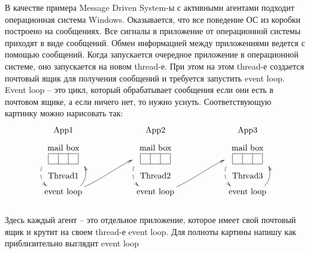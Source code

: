 В качестве примера Message Driven System-ы с активными агентами подходит операционная система Windows.
Оказывается, что все поведение ОС из коробки построено на сообщениях.
Все сигналы в приложение от операционной системы приходят в виде сообщений.
Обмен информацией между приложениями ведется с помощью сообщений.
Когда запускается очередное приложение в операционной системе, оно запускается на новом thread-е.
При этом на этом thread-е создается почтовый ящик для получения сообщений и требуется запустить event loop.
Event loop -- это цикл, который обрабатывает сообщения если они есть в почтовом ящике, а если ничего нет, то нужно уснуть.
Соответствующую картинку можно нарисовать так:
\[
\xymatrix@R=5pt{
  {\text{App1}}&{}&{\text{App2}}&{}&{\text{App3}}\\
  {
  \begin{tabular}{c}
  mail box\\
  \begin{tabular}{|c|c|c|}
  \hline
  {}&{}&{}\\
  \hline
  \end{tabular}
  \end{tabular}
  }
  \ar@(l,l)@{-->}[dd]
  &{}&{
  \begin{tabular}{c}
  mail box\\
  \begin{tabular}{|c|c|c|}
  \hline
  {}&{}&{}\\
  \hline
  \end{tabular}
  \end{tabular}
  }
  \ar@(l,l)@{-->}[dd]
  &{}&{
  \begin{tabular}{c}
  mail box\\
  \begin{tabular}{|c|c|c|}
  \hline
  {}&{}&{}\\
  \hline
  \end{tabular}
  \end{tabular}
  }
  \ar@(l,l)@{-->}[dd]
  \\
  {
  {\text{Thread1}}
  }&{}&{
  {\text{Thread2}}
  }&{}&{
  {\text{Thread3}}
  }\\
  {
  {\text{event loop}}
  }
  \ar@(r, r)[uu]\ar@(r, l)[uurr]
  &{}&{
  {\text{event loop}}
  }
  \ar@(r, l)[uurr]
  &{}&{
  {\text{event loop}}
  }
  \ar@(r, r)[uu]
  \\
  {}&{}&{}&{}&{}\\
}
\]
Здесь каждый агент -- это отдельное приложение, которое имеет свой почтовый ящик и крутит на своем thread-е event loop.
Для полноты картины напишу как приблизительно выглядит event loop
